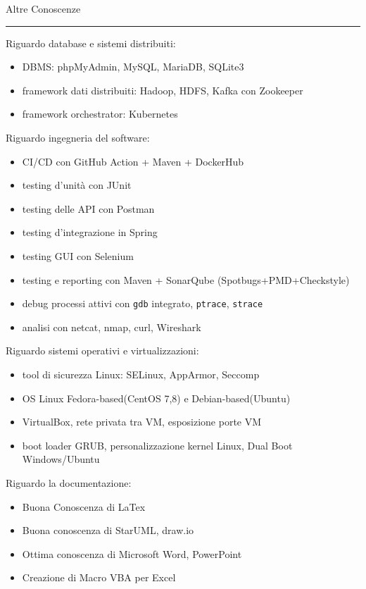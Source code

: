 \documentclass[a4paper]{letter}
\begin{document}
\begin{minipage}[t]{0.65\textwidth}
\setlength{\baselineskip}{1.4\baselineskip}

\vspace{2 mm}
{\large Altre Conoscenze}
\rule{\linewidth}{0.4pt}
\vspace{1 mm}
{\medium Riguardo database e sistemi distribuiti: }
\begin{itemize}
    \item DBMS: phpMyAdmin, MySQL, MariaDB, SQLite3
    \item framework dati distribuiti: Hadoop, HDFS, Kafka con Zookeeper 
    \item framework orchestrator: Kubernetes
\end{itemize}
\vspace{1 mm}
{\medium Riguardo ingegneria del software: }
\begin{itemize}
    \item CI/CD con GitHub Action + Maven + DockerHub
    \item testing d'unità con JUnit
    \item testing delle API con Postman
    \item testing d'integrazione in Spring
    \item testing GUI con Selenium
    \item testing e reporting con Maven + SonarQube (Spotbugs+PMD+Checkstyle)
    \item debug processi attivi con \texttt{gdb} integrato, \texttt{ptrace}, \texttt{strace}
    \item analisi con netcat, nmap, curl, Wireshark
\end{itemize}
\vspace{1 mm}
{\medium Riguardo sistemi operativi e virtualizzazioni: }
\begin{itemize}
    \item tool di sicurezza Linux: SELinux, AppArmor, Seccomp
    \item OS Linux Fedora-based(CentOS 7,8) e Debian-based(Ubuntu)  
    \item VirtualBox, rete privata tra VM, esposizione porte VM
    \item boot loader GRUB, personalizzazione kernel Linux, Dual Boot Windows/Ubuntu
\end{itemize}
\vspace{1 mm}
{\medium Riguardo la documentazione: }
\begin{itemize}
    \item Buona Conoscenza di LaTex
    \item Buona conoscenza di StarUML, draw.io 
    \item Ottima conoscenza di Microsoft Word, PowerPoint
    \item Creazione di Macro VBA per Excel
\end{itemize}

\end{minipage}
\end{document}
